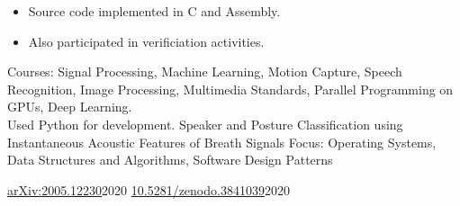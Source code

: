 \documentclass[
  a4paper, 
]{fortysecondscv}
\begin{document}
\begin{cvtable}[1.5]
{\begin{itemize}
{\begin{itemize}
                \item{Dataloader (download \& flash application images)}
                \item{BSP \& IO Device Drivers (Ethernet, Serial, Flash, NVRAM)}
            \end{itemize}}
            \item{Source code implemented in C and Assembly.}
            \item{Also participated in verificiation activities.}
        \end{itemize}
    }
\end{cvtable}

\begin{cvtable}[1.5]
		{Courses: Signal Processing, Machine Learning, Motion Capture, Speech Recognition, Image Processing, Multimedia Standards, Parallel Programming on GPUs, Deep Learning.\\Used Python for development.}
		{Speaker and Posture Classification using Instantaneous Acoustic Features of Breath Signals}
		{Focus: Operating Systems, Data Structures and Algorithms, Software Design Patterns}
\end{cvtable}

\begin{cvtable}
	    {\href{https://arxiv.org/abs/2005.12230}{arXiv:2005.12230}}{2020}
	    {\href{https://doi.org/10.5281/zenodo.3841039}{10.5281/zenodo.3841039}}{2020}
\end{cvtable}
\end{document}
